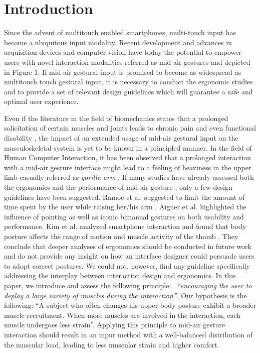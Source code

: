 \section{Introduction}

Since the advent of multitouch enabled smartphones, multi-touch input has become a ubiquitous input modality. Recent development and advances in acquisition devices and computer vision have today the potential to empower users with novel interaction modalities referred as mid-air gestures and depicted in Figure 1. %
If mid-air gestural input is promised to become as widespread as multitouch touch gestural input, it is necessary to conduct the ergonomic studies and to provide a set of relevant design guidelines which will guarantee a safe and optimal user experience.

Even if the literature in the field of biomechanics states that a prolonged solicitation of certain muscles and joints leads to chronic pain and even functional disability \cite{franklyn-miller_biomechanical_2014}, the impact of an extended usage of mid-air gestural input on the musculoskeletal system is yet to be known in a principled manner.  In the field of Human Computer Interaction, it has been observed that a prolonged interaction with a mid-air gesture interface might lead to a feeling of heaviness in the upper limb casually referred as \emph{gorilla-arm} \cite{aigner_understanding_2012}. If many studies have already assessed both the ergonomics and the performance of mid-air gesture \cite{aigner_understanding_2012,hincapie-ramos_consumed_2014,bachynskyi_performance_2015,sridhar_investigating_2015,straker_comparison_2008}, only a few design guidelines have been suggested. Ramoe et al. suggested to limit the amount of time spent by the user while raising her/his arm \cite{hincapie-ramos_consumed_2014}. Aigner et al. highlighted the influence of pointing as well as iconic bimanual gestures \cite{aigner_understanding_2012} on both usability and performance. Kim et al. analyzed smartphone interaction and found that body posture affects the range of motion and muscle activity of the thumb \cite{kim_biomechanical_2012}. They conclude that deeper analyses of ergonomics should be conducted in future work and do not provide any insight on how an interface designer could persuade users to adopt correct postures. We could not, however, find any guideline specifically addressing the interplay between interaction design and ergonomics. In this paper, we introduce and assess the following principle:~ \emph{``encouraging the user to deploy a large variety of muscles during the interaction''}. Our hypothesis is the following: ``A subject who often changes his upper body posture exhibit a broader muscle recruitment. When more muscles are involved in the interaction, each muscle undergoes less strain''. Applying this principle to mid-air gesture interaction should result in an input method with a well-balanced distribution of the muscular load, leading to less muscular strain and higher comfort.

